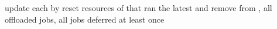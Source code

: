 \begin{algorithm}[t]
{{{            \vspace{0.2em}
            update each  by \;
        }
        \vspace{0.2em}
        reset resources of  that ran the latest  and remove from \;
    }
}
\vspace{0.2em}
\Return {}, all offloaded jobs, all jobs deferred at least once\;
\end{algorithm}
